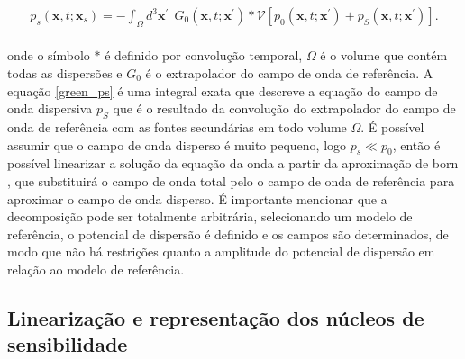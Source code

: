 \begin{eqnarray}
 p_{s}(\mathbf{x},t;\mathbf{x}_{s}) = - \int_{\Omega} d^{3} \mathbf{x}^{\prime}~~ G_{0} (\mathbf{x},t;\mathbf{x}^{\prime}) * \mathcal{V} \left [ p_{0} (\mathbf{x},t;\mathbf{x}^{\prime}) +  p_{S} (\mathbf{x},t;\mathbf{x}^{\prime}) \right].
 \label{green_ps}
\end{eqnarray}
\\
onde o símbolo $*$ é definido por convolução temporal, $\Omega$ é o volume que contém todas as dispersões e $G_{0}$ é o extrapolador do campo de onda de referência. A equação \ref{green_ps} é uma integral exata que descreve a equação do campo de onda dispersiva $p_{S}$ que é o resultado da convolução do extrapolador do campo de onda de referência com as fontes secundárias em todo volume $\Omega$. É possível assumir que o campo de onda disperso é muito pequeno, logo $p_{s} \ll p_{0} $, então é possível linearizar a solução da equação da onda a partir da aproximação de born , que substituirá o campo de onda total pelo o campo de onda de referência para aproximar o campo de onda disperso. 
É importante mencionar que a decomposição pode ser totalmente arbitrária, selecionando um modelo de referência, o potencial de dispersão é definido e os campos são determinados, de modo que não há restrições quanto a amplitude do potencial de dispersão em relação ao modelo de referência.

\subsection{Linearização e representação dos núcleos de sensibilidade}

